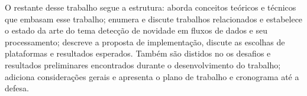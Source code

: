 
O restante desse trabalho segue a estrutura:
 aborda conceitos teóricos e técnicos que embasam
esse trabalho;
 enumera e discute trabalhos relacionados e estabelece
o estado da arte do tema detecção de novidade em fluxos de dados e seu processamento;
 descreve a proposta de implementação, discute
as escolhas de plataformas e resultados esperados.
Também são distidos no  os desafios e resultados preliminares encontrados
durante o desenvolvimento do trabalho;
 adiciona considerações gerais e apresenta o plano de trabalho
e cronograma até a defesa.
